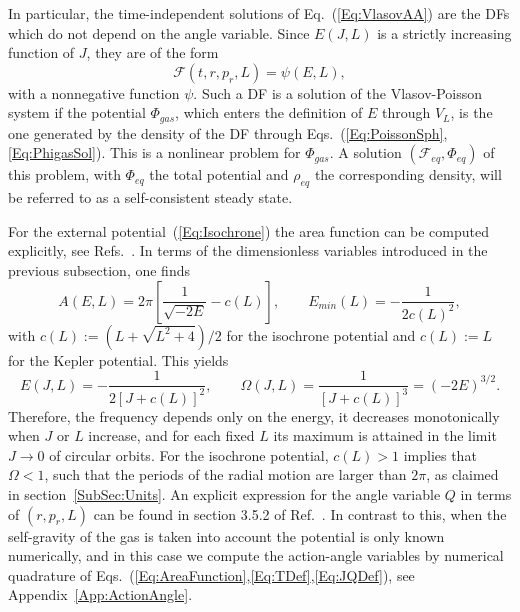 In particular, the time-independent solutions of Eq.~(\ref{Eq:VlasovAA}) are the DFs which do not depend on the angle variable. Since $E(J,L)$ is a strictly increasing function of $J$, they are of the form
\begin{equation}
\mathcal{F}(t,r,p_r,L) = \psi(E,L),
\label{Eq:SteadyState}
\end{equation}
with a nonnegative function $\psi$. Such a DF is a solution of the Vlasov-Poisson system if the potential $\Phi_{gas}$, which enters the definition of $E$ through $V_L$, is the one generated by the density of the DF through Eqs.~(\ref{Eq:PoissonSph},\ref{Eq:PhigasSol}). This is a nonlinear problem for $\Phi_{gas}$. A solution $(\mathcal{F}_{eq},\Phi_{eq})$ of this problem, with $\Phi_{eq}$ the total potential and $\rho_{eq}$ the corresponding density, will be referred to as a self-consistent steady state.

For the external potential~(\ref{Eq:Isochrone}) the area function can be computed explicitly, see Refs.~\cite{BinneyTremaine-Book,pRoS20}. In terms of the dimensionless variables introduced in the previous subsection, one finds
\begin{equation}
A(E,L) = 2\pi\left[ \frac{1}{\sqrt{-2E}} - c(L) \right],\qquad
E_{min}(L) = -\frac{1}{2c(L)^2},
\label{Eq:AreaIsochrone}
\end{equation}
with $c(L) := \left( L + \sqrt{L^2 + 4} \right)/2$ for the isochrone potential and $c(L) := L$ for the Kepler potential. This yields
\begin{equation}
E(J,L) = -\frac{1}{2\left[ J + c(L) \right]^2},\qquad
\Omega(J,L) = \frac{1}{\left[ J + c(L) \right]^3} = (-2E)^{3/2}.
\label{Eq:OmegaIsochrone}
\end{equation}
Therefore, the frequency depends only on the energy, it decreases monotonically when $J$ or $L$ increase, and for each fixed $L$ its maximum is attained in the limit $J\to 0$ of circular orbits. For the isochrone potential, $c(L) > 1$ implies that $\Omega < 1$, such that the periods of the radial motion are larger than $2\pi$, as claimed in section~\ref{SubSec:Units}. An explicit expression for the angle variable $Q$ in terms of $(r,p_r,L)$ can be found in section 3.5.2 of Ref.~\cite{BinneyTremaine-Book}. In contrast to this, when the self-gravity of the gas is taken into account the potential is only known numerically, and in this case we compute the action-angle variables by numerical quadrature of Eqs.~(\ref{Eq:AreaFunction},\ref{Eq:TDef},\ref{Eq:JQDef}), see Appendix~\ref{App:ActionAngle}.


